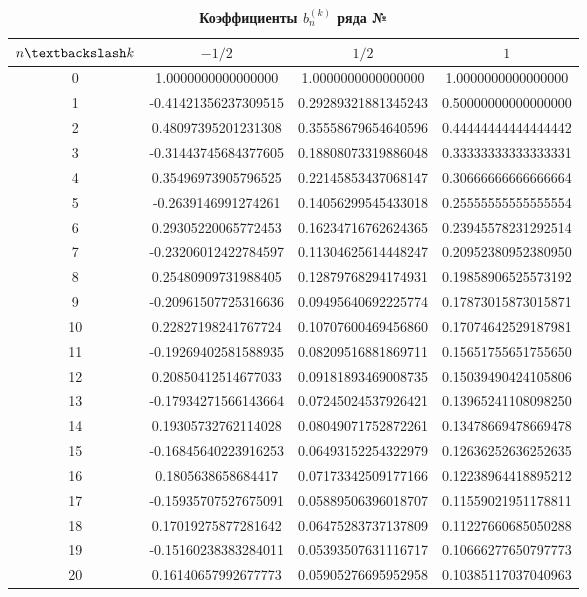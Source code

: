 \begin{table}[]
\caption{\textbf{Коэффициенты $b_n^{(k)}$ ряда №}}
\begin{center}
\begin{tabular}{|c|c|c|c|}
\hline
$n \textbackslash k$ & $-1/2$ & $1/2$ & $1$ \\
\hline
0  &  1.0000000000000000  & 1.0000000000000000  & 1.0000000000000000 \\
1  & -0.41421356237309515 & 0.29289321881345243 & 0.50000000000000000 \\
2  &  0.48097395201231308 & 0.35558679654640596 & 0.44444444444444442 \\
3  & -0.31443745684377605 & 0.18808073319886048 & 0.33333333333333331 \\
4  &  0.35496973905796525 & 0.22145853437068147 & 0.30666666666666664 \\
5  & -0.2639146991274261  & 0.14056299545433018 & 0.25555555555555554 \\
6  &  0.29305220065772453 & 0.16234716762624365 & 0.23945578231292514 \\
7  & -0.23206012422784597 & 0.11304625614448247 & 0.20952380952380950 \\
8  &  0.25480909731988405 & 0.12879768294174931 & 0.19858906525573192 \\
9  & -0.20961507725316636 & 0.09495640692225774 & 0.17873015873015871 \\
10 & 0.22827198241767724  & 0.10707600469456860 & 0.17074642529187981 \\
11 & -0.19269402581588935 & 0.08209516881869711 & 0.15651755651755650 \\
12 &  0.20850412514677033 & 0.09181893469008735 & 0.15039490424105806 \\
13 & -0.17934271566143664 & 0.07245024537926421 & 0.13965241108098250 \\
14 &  0.19305732762114028 & 0.08049071752872261 & 0.13478669478669478 \\
15 & -0.16845640223916253 & 0.06493152254322979 & 0.12636252636252635 \\
16 &  0.1805638658684417  & 0.07173342509177166 & 0.12238964418895212 \\
17 & -0.15935707527675091 & 0.05889506396018707 & 0.11559021951178811 \\
18 &  0.17019275877281642 & 0.06475283737137809 & 0.11227660685050288 \\
19 & -0.15160238383284011 & 0.05393507631116717 & 0.10666277650797773 \\
20 &  0.16140657992677773 & 0.05905276695952958 & 0.10385117037040963 \\

\end{tabular}
\end{center}
\end{table}

